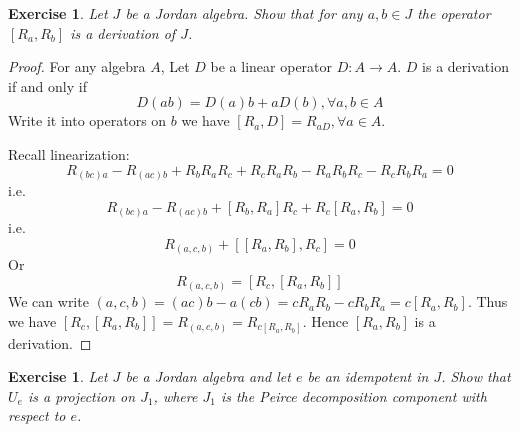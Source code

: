 \documentclass{article}
\newtheorem{exercise}[theorem]{Exercise}
\begin{document}
\begin{exercise}
Let $J$ be a Jordan algebra. Show that for any $a, b \in J$ the operator $[R_a, R_b]$ is a derivation of $J$.  
\end{exercise}

\begin{proof} 
For any algebra $ A $, Let $ D $ be a linear operator $ D: A\rightarrow A $. $ D $ is a derivation if and only if
\[
D(ab)=D(a)b+aD(b), \forall a,b \in A
\]
Write it into operators on $ b $ we have $[R_a,D]=R_{aD}, \forall a \in A$. 

Recall linearization:
\[
R_{(bc)a}-R_{(ac)b}+R_bR_aR_c+R_cR_aR_b-R_aR_bR_c-R_cR_bR_a=0
\]
i.e.
\[
R_{(bc)a}-R_{(ac)b}+[R_b,R_a]R_c+R_c[R_a,R_b]=0
\]
i.e.
\[
R_{(a,c,b)}+[[R_a,R_b],R_c]=0
\]
Or
\[
R_{(a,c,b)}=[R_c,[R_a,R_b]] \tag{IV}
\]
We can write $ (a,c,b)=(ac)b-a(cb)=cR_aR_b-cR_bR_a=c[R_a,R_b]$. Thus we have $ [R_c,[R_a,R_b]]=R_{(a,c,b)}=R_{c[R_a,R_b]} $. Hence $ [R_a,R_b] $ is a derivation.

\end{proof}

\begin{exercise}
Let $J$ be a Jordan algebra and let $e$ be an idempotent in $J$. Show that $U_e$ is a projection on $J_1$, where $J_1$ is the Peirce decomposition component with respect to $e$.  
\end{exercise}
\end{document}
